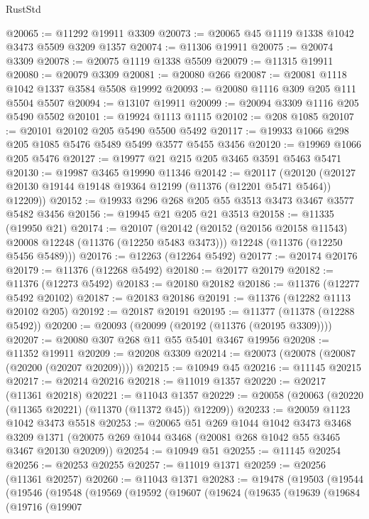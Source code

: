 \begin{lexlean}{RustStd}
\begin{coremodule}
{{{{{{{{{{{{{{{{{{{@20065 := @11292 @19911 @3309
@20073 := @20065 @45 @1119 @1338 @1042 @3473 @5509 @3209 @1357
@20074 := @11306 @19911
@20075 := @20074 @3309
@20078 := @20075 @1119 @1338 @5509
@20079 := @11315 @19911
@20080 := @20079 @3309
@20081 := @20080 @266
@20087 := @20081 @1118 @1042 @1337 @3584 @5508 @19992
@20093 := @20080 @1116 @309 @205 @111 @5504 @5507
@20094 := @13107 @19911
@20099 := @20094 @3309 @1116 @205 @5490 @5502
@20101 := @19924 @1113 @1115
@20102 := @208 @1085
@20107 := @20101 @20102 @205 @5490 @5500 @5492
@20117 := @19933 @1066 @298 @205 @1085 @5476 @5489 @5499 @3577 @5455 @3456
@20120 := @19969 @1066 @205 @5476
@20127 := @19977 @21 @215 @205 @3465 @3591 @5463 @5471
@20130 := @19987 @3465 @19990 @11346
@20142 := @20117
    (@20120 (@20127 @20130 @19144 @19148 @19364 @12199 (@11376 (@12201 @5471 @5464)) @12209))
@20152 := @19933 @296 @268 @205 @55 @3513 @3473 @3467 @3577 @5482 @3456
@20156 := @19945 @21 @205 @21 @3513
@20158 := @11335 (@19950 @21)
@20174 := @20107
    (@20142
      (@20152 (@20156 @20158 @11543) @20008 @12248 (@11376 (@12250 @5483 @3473)))
      @12248
      (@11376 (@12250 @5456 @5489)))
@20176 := @12263 (@12264 @5492)
@20177 := @20174 @20176
@20179 := @11376 (@12268 @5492)
@20180 := @20177 @20179
@20182 := @11376 (@12273 @5492)
@20183 := @20180 @20182
@20186 := @11376 (@12277 @5492 @20102)
@20187 := @20183 @20186
@20191 := @11376 (@12282 @1113 @20102 @205)
@20192 := @20187 @20191
@20195 := @11377 (@11378 (@12288 @5492))
@20200 := @20093 (@20099 (@20192 (@11376 (@20195 @3309))))
@20207 := @20080 @307 @268 @11 @55 @5401 @3467 @19956
@20208 := @11352 @19911
@20209 := @20208 @3309
@20214 := @20073 (@20078 (@20087 (@20200 (@20207 @20209))))
@20215 := @10949 @45
@20216 := @11145 @20215
@20217 := @20214 @20216
@20218 := @11019 @1357
@20220 := @20217 (@11361 @20218)
@20221 := @11043 @1357
@20229 := @20058 (@20063 (@20220 (@11365 @20221) (@11370 (@11372 @45)) @12209))
@20233 := @20059 @1123 @1042 @3473 @5518
@20253 := @20065
    @51
    @269
    @1044
    @1042
    @3473
    @3468
    @3209
    @1371
    (@20075 @269 @1044 @3468 (@20081 @268 @1042 @55 @3465 @3467 @20130 @20209))
@20254 := @10949 @51
@20255 := @11145 @20254
@20256 := @20253 @20255
@20257 := @11019 @1371
@20259 := @20256 (@11361 @20257)
@20260 := @11043 @1371
@20283 := @19478
    (@19503
      (@19544
        (@19546
          (@19548
            (@19569
              (@19592
                (@19607
                  (@19624
                    (@19635
                      (@19639
                        (@19684
                          (@19716
                            (@19907
}}}}}}}}}}}}}}}}}}}
\end{coremodule}
\end{lexlean}
